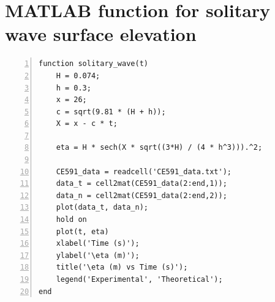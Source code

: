 \documentclass[a4paper]{article}
\begin{document}
\section{\small MATLAB function for solitary wave surface elevation}
\begin{lstlisting}[frame=single, numbers=left, style=Matlab-Pyglike]
function solitary_wave(t)
    H = 0.074;
    h = 0.3;
    x = 26;
    c = sqrt(9.81 * (H + h));
    X = x - c * t;

    eta = H * sech(X * sqrt((3*H) / (4 * h^3))).^2;

    CE591_data = readcell('CE591_data.txt');
    data_t = cell2mat(CE591_data(2:end,1));
    data_n = cell2mat(CE591_data(2:end,2));
    plot(data_t, data_n);
    hold on
    plot(t, eta)
    xlabel('Time (s)');
    ylabel('\eta (m)');
    title('\eta (m) vs Time (s)');
    legend('Experimental', 'Theoretical');
end
\end{lstlisting}
\end{document}
